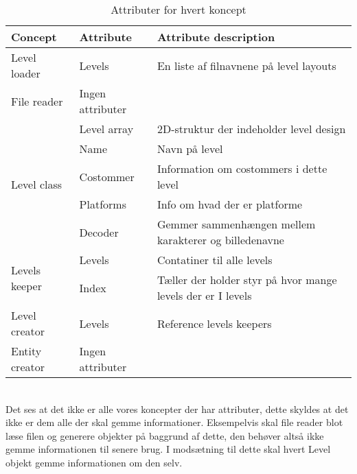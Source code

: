 \begin{table}[!h]
\centering
\begin{tabular}{|l|l|l|}
\hline
\textbf{Concept}               & \textbf{Attribute} & \textbf{Attribute description}                              \\ \hline
Level loader                   & Levels             & En liste af filnavnene på level layouts                     \\ \hline
File reader                    & Ingen attributer   &                                                             \\ \hline
\multirow{5}{*}{Level class}   & Level array        & 2D-struktur der indeholder level design                     \\ \cline{2-3}
                               & Name               & Navn på level                                               \\ \cline{2-3}
                               & Costommer          & Information om costommers i dette level                     \\ \cline{2-3}
                               & Platforms          & Info om hvad der er platforme                               \\ \cline{2-3}
                               & Decoder            & Gemmer sammenhængen mellem karakterer og billedenavne       \\ \hline
\multirow{2}{*}{Levels keeper} & Levels             & Contatiner til alle levels                                  \\ \cline{2-3}
                               & Index              & Tæller der holder styr på hvor mange levels der er I levels \\ \hline
Level creator                  & Levels             & Reference levels keepers                                    \\ \hline
Entity creator                 & Ingen attributer   &                                                             \\ \hline
\end{tabular}
\caption{Attributer for hvert koncept}
\label{attributes}
\end{table}\\
Det ses at det ikke er alle vores koncepter der har attributer, dette skyldes at det ikke er dem alle der skal gemme informationer. Eksempelvis skal file reader blot læse filen og generere objekter på baggrund af dette, den behøver altså ikke gemme informationen til senere brug. I modsætning til dette skal hvert Level objekt gemme informationen om den selv.\\
